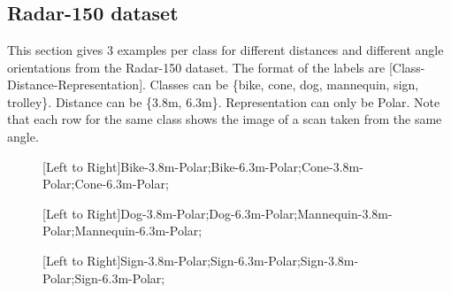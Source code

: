 \chapter{}

\section{Radar-150 dataset}\label{apb}
This section gives 3 examples per class for different distances and different angle orientations from the Radar-150 dataset. The format of the labels are [Class-Distance-Representation]. Classes can be \{bike, cone, dog, mannequin, sign, trolley\}. Distance can be \{3.8m, 6.3m\}. Representation can only be Polar. Note that each row for the same class shows the image of a scan taken from the same angle. 


\begin{figure}[h]
	\centering
	\epsfxsize=7.5cm
	{}{}\caption{[Left to Right]Bike-3.8m-Polar;Bike-6.3m-Polar;Cone-3.8m-Polar;Cone-6.3m-Polar;}
	\label{fig:blocks}
\end{figure} 

\begin{figure}[h]
	\centering
	\epsfxsize=7.5cm
	{}{}\caption{[Left to Right]Dog-3.8m-Polar;Dog-6.3m-Polar;Mannequin-3.8m-Polar;Mannequin-6.3m-Polar;}
	\label{fig:blocks}
\end{figure} 

\begin{figure}[h]
	\centering
	\epsfxsize=7.5cm
	{}{}\caption{[Left to Right]Sign-3.8m-Polar;Sign-6.3m-Polar;Sign-3.8m-Polar;Sign-6.3m-Polar;}
	\label{fig:blocks}
\end{figure} 

